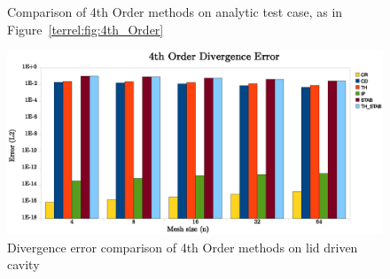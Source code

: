\begin{figure}
 \caption{Comparison of 4th Order methods on analytic test case, as in Figure~\ref{terrel:fig:4th_Order}}
 \label{terrel:fig:4th_Order_2}
\end{figure}


\begin{figure}
  \includegraphics[scale=.65]{chapters/terrel/eps/div_4_test.eps}
  \caption{Divergence error comparison of 4th Order methods on lid driven cavity}
  \label{terrel:fig:4th_Order_lid}
\end{figure}


